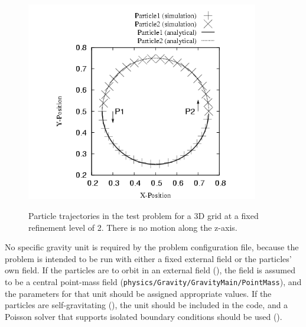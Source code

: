 \begin{figure}[!ht]
\begin{center}
{\leavevmode\includegraphics[width=4in]{Orbit_plot}}
\end{center}
\caption{\label{Fig:orbit} Particle trajectories in the 
test problem for a 3D grid at a fixed refinement level of 2.  There is 
no motion along the z-axis. 
}
\end{figure}



No specific gravity unit is required by the problem
configuration file, because the problem is intended to be run with
either a fixed external field or the particles' own field. If the
particles are to orbit in an external field (), the field is assumed to be a central point-mass field
(\texttt{physics/\-Gravity/\-GravityMain/\-PointMass}), and the parameters for that unit should
be assigned appropriate values. If the particles are
self-gravitating (), the
 unit should be included in the code, and a
Poisson solver that supports isolated boundary conditions should be
used (). 

